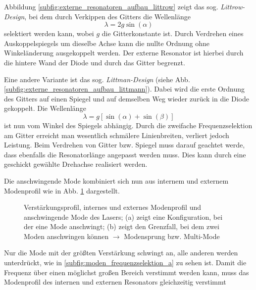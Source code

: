 Abbildung \ref{subfig:externe_resonatoren_aufbau_littrow} zeigt das sog.
\textit{Littrow-Design}, bei dem durch Verkippen des Gitters die Wellenlänge
\begin{equation}\label{eq:littrow}
	\lambda=2g\sin{(\alpha)}
\end{equation}
selektiert werden kann, wobei $g$ die Gitterkonstante ist. Durch Verdrehen eines
Auskoppelspiegels um dieselbe Achse kann die nullte Ordnung ohne Winkeländerung ausgekoppelt werden. Der
externe Resonator ist hierbei durch die hintere Wand der Diode und durch das
Gitter begrenzt.\par
Eine andere Variante ist das sog. \textit{Littman-Design} (siehe Abb.
\ref{subfig:externe_resonatoren_aufbau_littmann}). Dabei wird die erste Ordnung
des Gitters auf einen Spiegel und auf demselben Weg wieder zurück in die
Diode gekoppelt. Die Wellenlänge
\begin{equation}\label{eq:littmann}
	\lambda=g\left[\sin{(\alpha)}+\sin{(\beta)}\right]
\end{equation}
ist nun vom Winkel des Spiegels abhängig. Durch die zweifache Frequenzselektion
am Gitter erreicht man wesentlich schmälere Linienbreiten, verliert jedoch
Leistung. Beim Verdrehen von Gitter bzw. Spiegel muss darauf geachtet werde,
dass ebenfalls die Resonatorlänge angepasst werden muss. Dies kann durch
eine geschickt gewählte Drehachse realisiert werden.\par
Die anschwingende Mode kombiniert sich nun aus internem und externem Modenprofil
wie in Abb. \ref{fig:moden_frequenzselektion} dargestellt.
\begin{figure}[h]
	\footnotesize	
	\centering
	\subfigure[]{
		\label{subfig:moden_frequenzselektion_a}
		
  	}
	\subfigure[]{
		\label{subfig:moden_frequenzselektion_b}
		
  	}
	\caption[Diodenlaser - Verstärkungsprofil]{Verstärkungsprofil, internes und
	externes Modenprofil und anschwingende Mode des
	Lasers; (a) zeigt eine Konfiguration, bei der eine Mode anschwingt; (b) zeigt
	den Grenzfall, bei dem zwei Moden anschwingen können $\rightarrow$
	Modensprung bzw. Multi-Mode}
	\label{fig:moden_frequenzselektion}
\end{figure}
Nur die Mode mit der größten Verstärkung schwingt an, alle anderen
werden unterdrückt, wie in \ref{subfig:moden_frequenzselektion_a} zu sehen ist.
Damit die Frequenz über einen möglichst großen Bereich verstimmt werden kann,
muss das Modenprofil des internen und externen Resonators gleichzeitig verstimmt
